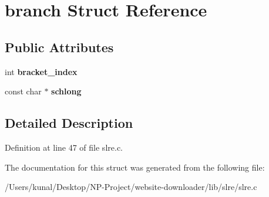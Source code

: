 \hypertarget{structbranch}{}\section{branch Struct Reference}
\label{structbranch}
\subsection*{Public Attributes}
\begin{DoxyCompactItemize}
\item 
\mbox{\label{structbranch_a0007342459cd5c8b55d61b4236fba136}} 
int {\bfseries bracket\+\_\+index}
\item 
\mbox{\label{structbranch_ac7ad084f103f554c5749ad5578a87bd5}} 
const char $\ast$ {\bfseries schlong}
\end{DoxyCompactItemize}


\subsection{Detailed Description}


Definition at line 47 of file slre.\+c.



The documentation for this struct was generated from the following file\+:\begin{DoxyCompactItemize}
\item 
/\+Users/kunal/\+Desktop/\+N\+P-\/\+Project/website-\/downloader/lib/slre/slre.\+c\end{DoxyCompactItemize}
